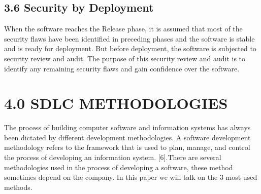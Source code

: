 \documentclass[12pt]{extreport}
\begin{document}
\subsection*{3.6	Security by Deployment}
When the software reaches the Release phase, it is assumed that most of the security flaws have been identified in preceding phases and the software is stable and is ready for deployment. But before deployment, the software is subjected to security review and audit. The purpose of this security review and audit is to identify any remaining security flaws and gain confidence over the software.

\newpage
\section*{4.0 	SDLC METHODOLOGIES}
The  process  of  building  computer  software  and  information  systems  has  always been dictated  by  different  development  methodologies. A software development methodology refers to the framework that is used to plan, manage, and control the process of developing an information system. [6].There are several methodologies used in the process of developing a software, these method sometimes depend on the company. In this paper we will talk on the 3 most used methods.
\end{document}
